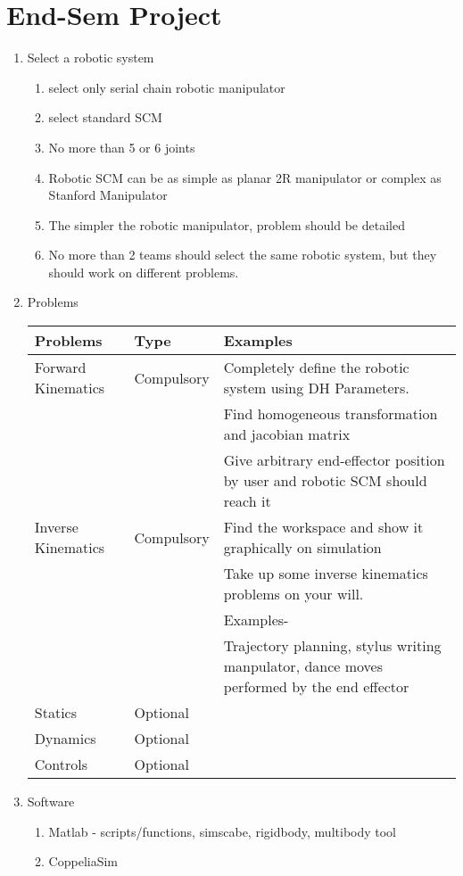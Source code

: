 \documentclass[11pt]{report}
\begin{document}
\part{End-Sem Project}
\label{sec:org2a8ebff}
\begin{enumerate}
\item Select a robotic system
\begin{enumerate}
\item select only serial chain robotic manipulator
\item select standard SCM
\item No more than 5 or 6 joints
\item Robotic SCM can be as simple as planar 2R manipulator or complex as Stanford Manipulator
\item The simpler the robotic manipulator, problem should be detailed
\item No more than 2 teams should select the same robotic system, but they should work on different problems.
\end{enumerate}
\item Problems
\begin{center}
\begin{tabular}{lll}
\hline
Problems & Type & Examples\\
\hline
Forward Kinematics & Compulsory & Completely define the robotic system using DH Parameters.\\
 &  & Find homogeneous transformation and jacobian matrix\\
 &  & Give arbitrary end-effector position by user and robotic SCM should reach it\\
\hline
Inverse Kinematics & Compulsory & Find the workspace and show it graphically on simulation\\
 &  & Take up some inverse kinematics problems on your will.\\
 &  & Examples-\\
 &  & Trajectory planning, stylus writing manpulator, dance moves performed by the end effector\\
\hline
Statics & Optional & \\
Dynamics & Optional & \\
Controls & Optional & \\
\hline
\end{tabular}
\end{center}
\item Software
\begin{enumerate}
\item Matlab - scripts/functions, simscabe, rigidbody, multibody tool
\item CoppeliaSim
\end{enumerate}
\end{enumerate}
\end{document}
